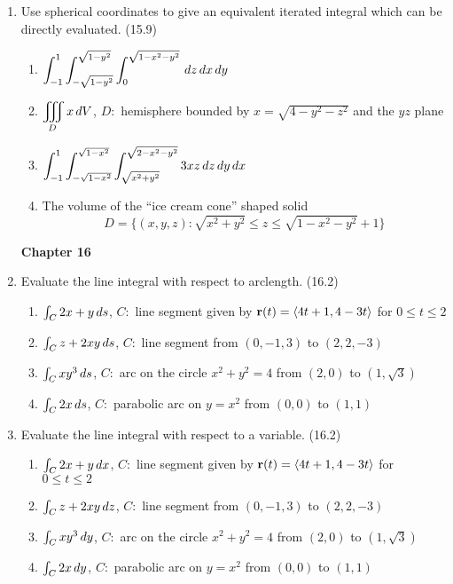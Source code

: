 \begin{enumerate}
    \item Use spherical coordinates to give an equivalent iterated integral which can be directly evaluated. (15.9)

      \begin{enumerate}
        \item $\displaystyle\int_{-1}^1\int_{-\sqrt{1-y^2}}^{\sqrt{1-y^2}}\int_0^{\sqrt{1-x^2-y^2}} \,d{z}\,d{x}\,d{y}$
        \item $\displaystyle\iiint_D x\,d{V}$, $D:$ hemisphere bounded by $x=\sqrt{4-y^2-z^2}$ and the $yz$ plane
        \item $\displaystyle\int_{-1}^{1}\int_{-\sqrt{1-x^2}}^{\sqrt{1-x^2}}\int_{\sqrt{x^2+y^2}}^{\sqrt{2-x^2-y^2}}3xz\,d{z}\,d{y}\,d{x}$
        \item The volume of the ``ice cream cone'' shaped solid \[D = \{(x,y,z): \sqrt{x^2+y^2} \leq z\leq \sqrt{1-x^2-y^2}+1\}\]
      \end{enumerate}

  \newpage
  \centerline{\bf Chapter 16}

    \item Evaluate the line integral with respect to arclength. (16.2)

      \begin{enumerate}
        \item $\int_C 2x+y\,d{s}$, $C:$ line segment given by $\mathbf{r}(t)=\left<4t+1,4-3t\right>$ for $0\leq t\leq 2$
        \item $\int_C z + 2xy\,d{s}$, $C:$ line segment from $(0,-1,3)$ to $(2,2,-3)$
        \item $\int_C xy^3\,d{s}$, $C:$ arc on the circle $x^2+y^2=4$ from $(2,0)$ to $(1,\sqrt{3})$
        \item $\int_C 2x\,d{s}$, $C:$ parabolic arc on $y=x^2$ from $(0,0)$ to $(1,1)$
      \end{enumerate}

    \item Evaluate the line integral with respect to a variable. (16.2)

      \begin{enumerate}
        \item $\int_C 2x+y\,d{x}$, $C:$ line segment given by $\mathbf{r}(t)=\left<4t+1,4-3t\right>$ for $0\leq t\leq 2$
        \item $\int_C z + 2xy\,d{z}$, $C:$ line segment from $(0,-1,3)$ to $(2,2,-3)$
        \item $\int_C xy^3\,d{y}$, $C:$ arc on the circle $x^2+y^2=4$ from $(2,0)$ to $(1,\sqrt{3})$
        \item $\int_C 2x\,d{y}$, $C:$ parabolic arc on $y=x^2$ from $(0,0)$ to $(1,1)$
      \end{enumerate}


\end{enumerate}
